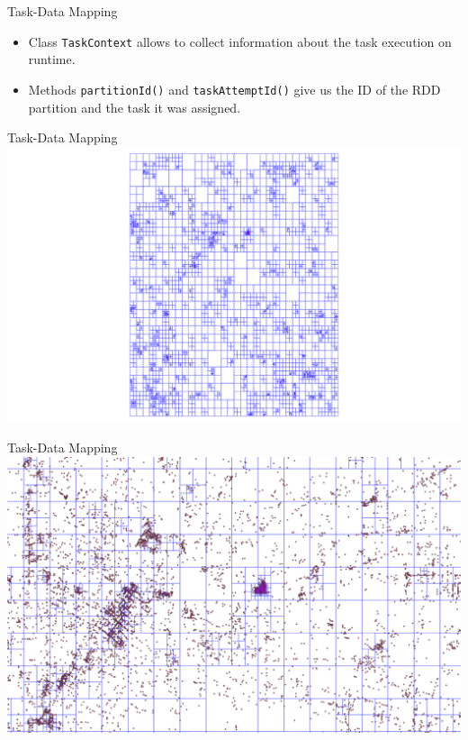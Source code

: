 \documentclass{beamer}
\begin{document}
\begin{frame}{Task-Data Mapping}
    \begin{itemize}
        \item Class \texttt{TaskContext} allows to collect information about the task execution on runtime.
        \item Methods \texttt{partitionId()} and \texttt{taskAttemptId()} give us the ID of the RDD partition and the task it was assigned.
    \end{itemize}
    
\end{frame}

\begin{frame}{Task-Data Mapping}
  \centering
  \includegraphics[width=\textwidth]{figures/BadPartitions3}
\end{frame}
\begin{frame}{Task-Data Mapping}
  \centering
  \includegraphics[width=\textwidth]{figures/BadPartitions2}
\end{frame}
\end{document}
